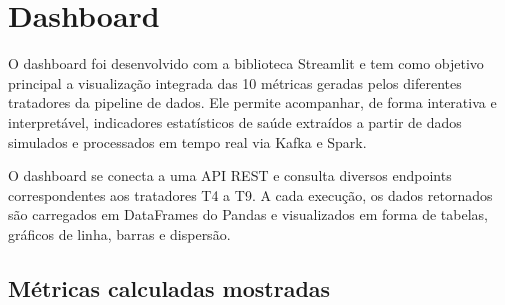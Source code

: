 \documentclass[a4paper,12pt]{article}
\begin{document}
\section{Dashboard}

O dashboard foi desenvolvido com a biblioteca Streamlit e tem como objetivo principal a visualização integrada das 10 métricas geradas pelos diferentes tratadores da pipeline de dados. Ele permite acompanhar, de forma interativa e interpretável, indicadores estatísticos de saúde extraídos a partir de dados simulados e processados em tempo real via Kafka e Spark.

O dashboard se conecta a uma API REST  e consulta diversos endpoints correspondentes aos tratadores T4 a T9. A cada execução, os dados retornados são carregados em DataFrames do Pandas e visualizados em forma de tabelas, gráficos de linha, barras e dispersão.


\subsection*{Métricas calculadas mostradas}
\end{document}
